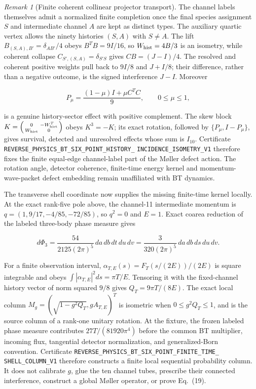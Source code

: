 \documentclass[11pt]{article}
\theoremstyle{definition}
\theoremstyle{remark}
\newtheorem{remark}[theorem]{Remark}
\begin{document}
\begin{remark}[Finite coherent collinear projector transport]
The channel labels themselves admit a normalized finite completion once the
final species assignment $S$ and intermediate channel $A$ are kept as distinct
types.  The auxiliary quartic vertex allows the ninety histories $(S,A)$ with
$S\ne A$.  The lift
$B_{(S,A),B'}=\delta_{AB'}/4$ obeys $B^TB=9I/16$, so
$W_{\rm hist}=4B/3$ is an isometry, while coherent collapse
$C_{S',(S,A)}=\delta_{S'S}$ gives $CB=(J-I)/4$.  The resolved and coherent
positive weights pull back to $9I/8$ and $J+I/8$; their difference, rather
than a negative outcome, is the signed interference $J-I$.  Moreover

\[
 P_\mu=\frac{(1-\mu)I+\mu C^TC}{9},\qquad0\le\mu\le1,
\]

is a genuine history-sector effect with positive complement.  The skew block
$K=\left(\begin{smallmatrix}0&-W_{\rm hist}^T\\
W_{\rm hist}&0\end{smallmatrix}\right)$ obeys $K^3=-K$; its exact rotation,
followed by $\{P_\mu,I-P_\mu\}$, gives survival, detected and unresolved
effects whose sum is $I_{10}$.  Certificate
\texttt{REVERSE\_PHYSICS\_BT\_SIX\_POINT\_HISTORY\_}
\allowbreak\texttt{INCIDENCE\_ISOMETRY\_V1}
therefore fixes the finite equal-edge channel-label part of the Møller defect
action.  The rotation angle, detector coherence, finite-time energy kernel and
momentum-wave-packet defect embedding remain unaffiliated with BT dynamics.

The transverse shell coordinate now supplies the missing finite-time kernel
locally.  At the exact rank-five pole above, the channel-11 intermediate
momentum is
$q=(1,9/17,-4/85,-72/85)$, so $q^2=0$ and $E=1$.  Exact coarea reduction of
the labeled three-body phase measure gives

\[
 d\Phi_3=\frac{54}{2125(2\pi)^5}\,da\,db\,dt\,du\,dv
 =\frac{3}{320(2\pi)^5}\,da\,db\,ds\,du\,dv .
\]

For a finite observation interval,
$\alpha_{T,E}(s)=F_T(s/(2E))/(2E)$ is square integrable and obeys
$\int|\alpha_{T,E}|^2ds=\pi T/E$.  Tensoring it with the fixed-channel
history vector of norm squared $9/8$ gives
$Q_T=9\pi T/(8E)$.  The exact local column
$M_g=(\sqrt{1-g^2Q_T},gA_{T,E})^T$ is isometric when
$0\leq g^2Q_T\leq1$, and is the source column of a rank-one unitary
rotation.  At the fixture, the frozen labeled phase measure contributes
$27T/(81920\pi^4)$ before the common BT multiplier, incoming flux,
tangential detector normalization, and generalized-Born convention.
Certificate
\texttt{REVERSE\_PHYSICS\_BT\_SIX\_POINT\_FINITE\_TIME\_}
\allowbreak\texttt{SHELL\_COLUMN\_V1}
therefore constructs a finite local sequential probability column.  It does
not calibrate $g$, glue the ten channel tubes, prescribe their connected
interference, construct a global Møller operator, or prove Eq.~(19).


\end{remark}
\end{document}
